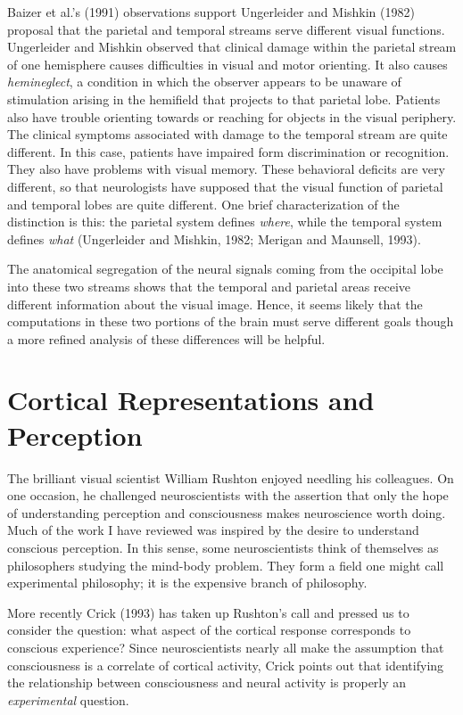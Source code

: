 Baizer et al.'s (1991) observations support
Ungerleider and Mishkin (1982) proposal that
the parietal and temporal
streams serve different visual functions.
Ungerleider and Mishkin observed that clinical damage within the 
parietal stream of one hemisphere causes difficulties in visual
and motor orienting.
It also causes {\em hemineglect}, a condition in which
the observer appears to be unaware of stimulation arising in
the hemifield that projects to that parietal lobe.
Patients also have trouble orienting towards or reaching
for objects in the visual periphery.
The clinical symptoms associated with
damage to the temporal stream are
quite different.
In this case, patients have impaired form discrimination
or recognition.
They also have problems with visual memory.
These behavioral deficits are very different,
so that neurologists have
supposed that the visual function of parietal and temporal
lobes are quite different.
One brief characterization of the distinction is this:
the parietal system defines {\em where}, while the
temporal system defines {\em what} 
(Ungerleider and Mishkin, 1982; Merigan and Maunsell, 1993).

The anatomical segregation of the neural signals
coming from the occipital lobe into these two streams
shows that the temporal and parietal areas receive different
information about the visual image.
Hence, it seems likely that the computations in these two
portions of the brain must serve different goals though
a more refined analysis of these differences will be helpful.

\section{Cortical Representations and Perception}
The brilliant visual scientist
William Rushton enjoyed needling his colleagues.
On one occasion, he challenged neuroscientists with the
assertion that only the hope of
understanding perception and consciousness
makes neuroscience worth doing.
Much of the work I have reviewed
was inspired by the desire to understand conscious perception. 
In this sense, some neuroscientists think of themselves
as philosophers studying the mind-body problem.
They form a field one might call experimental philosophy;
it is the expensive branch of philosophy.

More recently Crick (1993) has taken up Rushton's call
and pressed us to consider the question:
what aspect of the cortical
response corresponds to conscious experience?
Since neuroscientists nearly all make the assumption that
consciousness is a correlate of cortical activity,
Crick points out that identifying the
relationship between consciousness and neural activity
is properly an {\em experimental} question.


